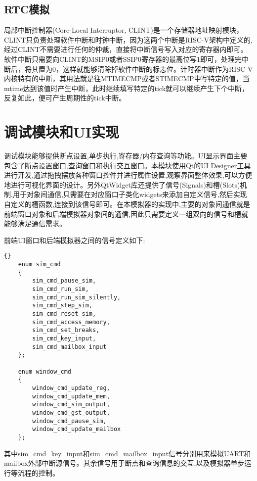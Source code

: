 \subsection{RTC模拟}

局部中断控制器(Core-Local Interruptor, CLINT)是一个存储器地址映射模块，CLINT只负责处理软件中断和时钟中断，因为这两个中断是RISC-V架构中定义的,经过CLINT不需要进行任何的仲裁，直接将中断信号写入对应的寄存器内即可。软件中断只需要向CLINT的MSIP0或者SSIP0寄存器的最高位写1即可，处理完中断后，将其置为0，这样就能够清除掉软件中断的标志位。计时器中断作为RISC-V内核特有的中断，其用法就是往MTIMECMP或者STIMECMP中写特定的值，当mtime达到该值时产生中断，此时继续填写特定的tick就可以继续产生下个中断，反复如此，便可产生周期性的tick中断。



\section{调试模块和UI实现}
调试模块能够提供断点设置,单步执行,寄存器/内存查询等功能。UI显示界面主要包含了断点设置窗口,查询窗口和执行交互窗口。本模块使用Qt的UI Designer工具进行开发,通过拖拽摆放各种窗口控件并进行属性设置,观察界面整体效果,可以方便地进行可视化界面的设计。另外QtWidget库还提供了信号(Signals)和槽(Slots)机制,用于对象间通信,只需要在对应窗口子类化widgets来添加自定义信号,然后实现自定义的槽函数,连接到该信号即可。在本模拟器的实现中,主要的对象间通信就是前端窗口对象和后端模拟器对象间的通信,因此只需要定义一组双向的信号和槽就能够满足通信需求。


前端UI窗口和后端模拟器之间的信号定义如下:
\begin{lstlisting}{}
    enum sim_cmd
    {
        sim_cmd_pause_sim,
        sim_cmd_run_sim,
        sim_cmd_run_sim_silently,
        sim_cmd_step_sim,
        sim_cmd_reset_sim,
        sim_cmd_access_memory,
        sim_cmd_set_breaks,
        sim_cmd_key_input,
        sim_cmd_mailbox_input
    };
        
    enum window_cmd
    {
        window_cmd_update_reg,
        window_cmd_update_mem,
        window_cmd_sim_output,
        window_cmd_gst_output,
        window_cmd_pause_sim,
        window_cmd_update_mailbox
    };          
\end{lstlisting}
其中sim\_cmd\_key\_input和sim\_cmd\_mailbox\_input信号分别用来模拟UART和mailbox外部中断源信号。其余信号用于断点和查询信息的交互,以及模拟器单步运行等流程的控制。
        
